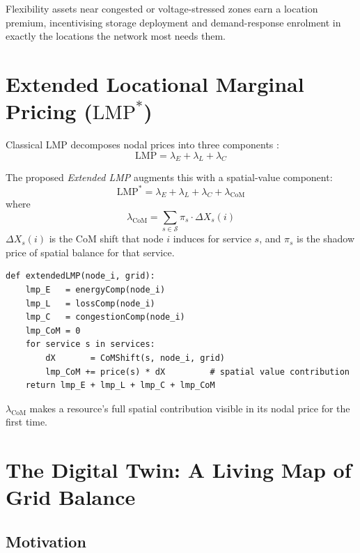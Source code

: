 \documentclass[12pt, a4paper]{article}
\begin{document}
Flexibility assets near congested or voltage-stressed zones earn a location
premium, incentivising storage deployment and demand-response enrolment in
exactly the locations the network most needs them.

\section{Extended Locational Marginal Pricing ($\mathrm{LMP}^*$)}
\label{sec:lmp_star}

Classical LMP decomposes nodal prices into three components
\citep{schweppe1988spot}:
\begin{equation}
  \mathrm{LMP} = \lambda_E + \lambda_L + \lambda_C
\end{equation}

The proposed \emph{Extended LMP} augments this with a spatial-value component:
\begin{equation}
  \boxed{
  \mathrm{LMP}^* = \lambda_E + \lambda_L + \lambda_C + \lambda_{\mathrm{CoM}}
  }
  \label{eq:lmp_star}
\end{equation}
where
\begin{equation}
  \lambda_{\mathrm{CoM}} = \sum_{s \in \mathcal{S}} \pi_s \cdot \Delta X_s(i)
\end{equation}
$\Delta X_s(i)$ is the CoM shift that node $i$ induces for service $s$, and
$\pi_s$ is the shadow price of spatial balance for that service.

\begin{lstlisting}[caption={Extended LMP* computation},
                   label={lst:lmpstar}]
def extendedLMP(node_i, grid):
    lmp_E   = energyComp(node_i)
    lmp_L   = lossComp(node_i)
    lmp_C   = congestionComp(node_i)
    lmp_CoM = 0
    for service s in services:
        dX       = CoMShift(s, node_i, grid)
        lmp_CoM += price(s) * dX         # spatial value contribution
    return lmp_E + lmp_L + lmp_C + lmp_CoM
\end{lstlisting}

\noindent
$\lambda_{\mathrm{CoM}}$ makes a resource's full spatial contribution visible in
its nodal price for the first time.

\section{The Digital Twin: A Living Map of Grid Balance}
\label{sec:digital_twin}

\subsection{Motivation}
\end{document}
